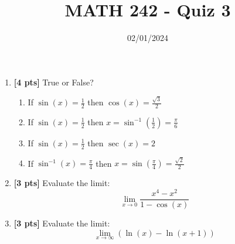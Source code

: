 \documentclass[12pt]{article}
\title{MATH 242 - Quiz 3}
\date{02/01/2024}
\begin{document}
\maketitle


\begin{enumerate}

\item \textbf{[4 pts]} True or False?
\begin{enumerate}
    \item If $\sin(x)=\frac{1}{2}$ then $\cos(x)=\frac{\sqrt{3}}{2}$
    \vfill
    \item If $\sin(x)=\frac{1}{2}$ then $x=\sin^{-1}(\frac{1}{2})=\frac{\pi}{6}$
    \vfill
    \item If $\sin(x)=\frac{1}{2}$ then $\sec(x)=2$
    \vfill
    \item If $\sin^{-1}(x)=\frac{\pi}{4}$ then $x=\sin(\frac{\pi}{4})=\frac{\sqrt{2}}{2}$
    \vfill
\end{enumerate}


\pagebreak


\item \textbf{[3 pts]} Evaluate the limit:
$$\lim_{x\to 0}\frac{x^4-x^2}{1-\cos(x)}$$

\vfill

\item \textbf{[3 pts]} Evaluate the limit:
$$\lim_{x\to\infty}(\ln(x)-\ln(x+1))$$
\vfill


\end{enumerate}
\end{document}
